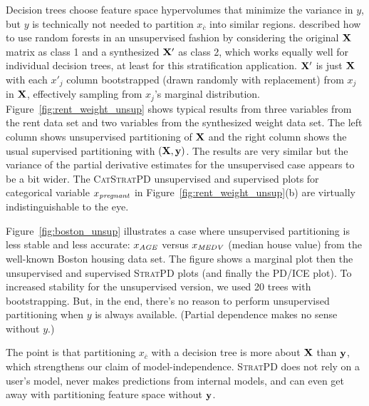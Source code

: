 \documentclass[12pt]{article}
\newcommand{\figref}[1]{Figure~\ref{#1}}
\newcommand{\spd}{\fontfamily{cmr}\textsc{\small StratPD}}
\newcommand{\cspd}{\fontfamily{cmr}\textsc{\small CatStratPD}}
\newcommand{\xnc}{$x_{\overline{c}}$}
\begin{document}
Decision trees choose feature space hypervolumes that minimize the variance in $y$, but $y$ is technically not needed to partition \xnc{} into similar regions. \cite{RFunsup} described how to use random forests in an unsupervised fashion by considering the original $\bf X$ matrix as class 1 and a synthesized $\bf X'$ as class 2, which works equally well for individual decision trees, at least for this stratification application. $\bf X'$ is just $\bf X$ with each $x'_j$ column bootstrapped (drawn randomly with replacement) from $x_j$ in $\bf X$, effectively sampling from $x_j$'s marginal distribution. \figref{fig:rent_weight_unsup} shows typical results from three variables from the rent data set and two variables from the synthesized weight data set.  The left column shows unsupervised partitioning of $\bf X$ and the right column shows the usual supervised partitioning with $(\bf X, y)$. The results are very similar but the variance of the partial derivative estimates for the unsupervised case appears to be a bit wider. The \cspd{} unsupervised and supervised plots for categorical variable $x_{\it pregnant}$ in \figref{fig:rent_weight_unsup}(b) are virtually indistinguishable to the eye. 

\figref{fig:boston_unsup} illustrates a case where unsupervised partitioning is less stable and less accurate: $x_{\it AGE}$ versus $x_{\it MEDV}$ (median house value) from the well-known Boston housing data set. The figure shows a marginal plot then the unsupervised and supervised \spd{} plots (and finally the PD/ICE plot). To increased stability for the unsupervised version, we used 20 trees with bootstrapping. But, in the end, there's no reason to perform unsupervised partitioning when $y$ is always available. (Partial dependence makes no sense without $y$.) 

The point is that partitioning \xnc{}  with a decision tree is more about $\bf X$ than $\bf y$, which strengthens our claim of model-independence. \spd{} does not rely on a user's model, never makes predictions from internal models, and can even get away with partitioning feature space without $\bf y$.
\end{document}
